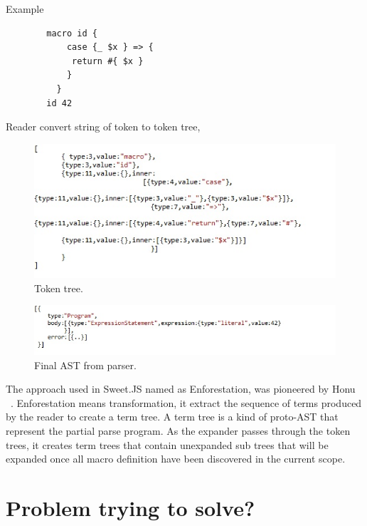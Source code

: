 Example

\begin{lstlisting}
		macro id {
  			case {_ $x } => {
   			 return #{ $x }
  			}
		  }
		id 42
\end{lstlisting}
Reader convert string of token to token tree, 
\begin{figure}[htb]
\centering
\includegraphics[width=1.0\textwidth]{images/readeroutput.jpg}
\caption{Token tree.} 
\label{fig:readeroutput}
\end{figure}

\begin{figure}[htb]
\centering
\includegraphics[width=1.0\textwidth]{images/AST.jpg}
\caption{Final AST from parser.} 
\label{fig:AST}
\end{figure}

The approach used in Sweet.JS named as Enforestation, was pioneered by Honu ~\cite{bib4}. Enforestation means transformation, it extract the sequence of terms produced by the reader to create a term tree. A term tree is a kind of proto-AST that represent the partial parse program. As the expander passes through the token trees, it creates term trees that contain unexpanded sub trees that will be expanded once all macro definition have been discovered in the current scope.



\section{Problem trying to solve?}

